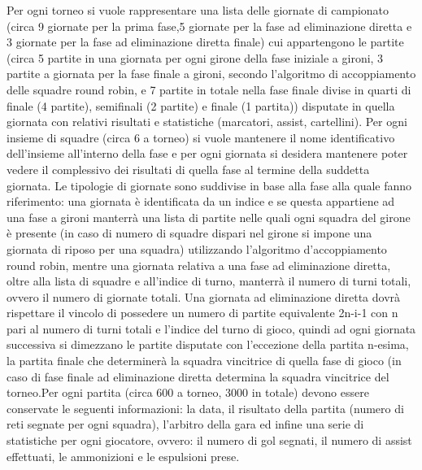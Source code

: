\documentclass[12pt, openany]{article}
\theoremstyle{definition}
\theoremstyle{plain}
\theoremstyle{remark}
\begin{document}
		Per ogni torneo si vuole rappresentare una lista delle giornate di campionato (circa 9 giornate per la prima fase,5 giornate per la fase ad eliminazione diretta e 3 giornate per la fase ad eliminazione diretta finale) cui appartengono le partite (circa 5 partite in una giornata per ogni girone della fase iniziale a gironi, 3 partite a giornata per la fase finale a gironi, secondo l’algoritmo di accoppiamento delle squadre round robin, e 7 partite in totale nella fase finale divise in quarti di finale (4 partite), semifinali (2 partite) e finale (1 partita)) disputate in quella giornata con relativi risultati e statistiche (marcatori, assist, cartellini).
		Per ogni insieme di squadre (circa 6 a torneo) si vuole mantenere il nome identificativo dell’insieme all’interno della fase e per ogni giornata si desidera mantenere poter vedere il complessivo dei risultati di quella fase al termine della suddetta giornata. Le tipologie di giornate sono suddivise in base alla fase alla quale fanno riferimento: una giornata è identificata da un indice e se questa appartiene ad una fase a gironi manterrà una lista di partite nelle quali ogni squadra del girone è presente (in caso di numero di squadre dispari nel girone si impone una giornata di riposo per una squadra) utilizzando l’algoritmo d’accoppiamento round robin, mentre una giornata relativa a una fase ad eliminazione diretta, oltre alla lista di squadre e all’indice di turno, manterrà il numero di turni totali, ovvero il numero di giornate totali.
		Una giornata ad eliminazione diretta dovrà rispettare il vincolo di possedere un numero di partite equivalente    2n-i-1 con n pari al numero di turni totali e l’indice del turno di gioco, quindi ad ogni giornata successiva si dimezzano le partite disputate con l’eccezione della partita n-esima, la partita finale che determinerà la squadra vincitrice di quella fase di gioco (in caso di fase finale ad eliminazione diretta determina la squadra vincitrice del torneo.Per ogni partita (circa 600 a torneo, 3000 in totale) devono essere conservate le seguenti informazioni: la data, il risultato della partita (numero di reti segnate per ogni squadra), l’arbitro della gara ed infine una serie di statistiche per ogni giocatore, ovvero: il numero di gol segnati, il numero di assist effettuati, le ammonizioni e le espulsioni prese.
\end{document}
